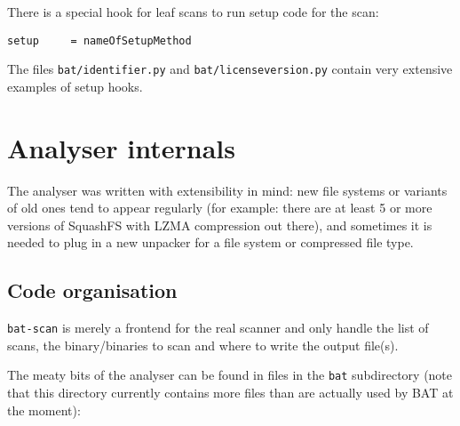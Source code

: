 \documentclass[10pt,a4paper]{article}
\begin{document}
There is a special hook for leaf scans to run setup code for the scan:

\begin{verbatim}
setup     = nameOfSetupMethod
\end{verbatim}

The files \texttt{bat/identifier.py} and \texttt{bat/licenseversion.py} contain
very extensive examples of setup hooks.

\section{Analyser internals}

The analyser was written with extensibility in mind: new file systems or
variants of old ones tend to appear regularly (for example: there are at
least 5 or more versions of SquashFS with LZMA compression out there), and
sometimes it is needed to plug in a new unpacker for a file system or
compressed file type.

\subsection{Code organisation}

\texttt{bat-scan} is merely a frontend for the real scanner and only handle
the list of scans, the binary/binaries to scan and where to write the output
file(s).

The meaty bits of the analyser can be found in files in the \texttt{bat}
subdirectory (note that this directory currently contains more files than are
actually used by BAT at the moment):
\end{document}

